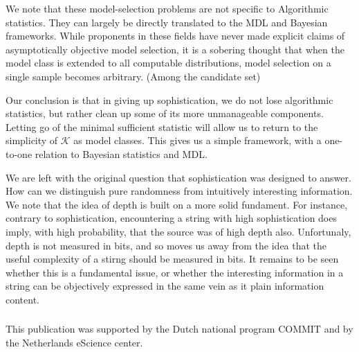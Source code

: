 \documentclass{style/llncs}
\newcommand{\K}{\mathscr K}
\begin{document}
We note that these model-selection problems are not specific to Algorithmic statistics. They can largely be directly translated to the MDL and Bayesian frameworks. While proponents in these fields have never made explicit claims of asymptotically objective model selection, it is a sobering thought that when the model class is extended to all computable distributions, model selection on a single sample becomes arbitrary. (Among the candidate set)

Our conclusion is that in giving up sophistication, we do not lose algorithmic statistics, but rather clean up some of its more unmanageable components. Letting go of the minimal sufficient statistic will allow us to return to the simplicity of $\K$ as model classes. This gives us a simple framework, with a one-to-one relation to Bayesian statistics and MDL. 

We are left with the original question that sophistication was designed to answer. How can we distinguish pure randomness from intuitively interesting information. We note that the idea of depth is built on a more solid fundament. For instance, contrary to sophistication, encountering a string with high sophistication does imply, with high probability, that the source was of high depth also. Unfortunaly, depth is not measured in bits, and so moves us away from the idea that the useful complexity of a stirng should be measured in bits. It remains to be seen whether this is a fundamental issue, or whether the interesting information in a string can be objectively expressed in the same vein as it plain information content. 

\subsubsection*{\ackname}

This publication was supported by the Dutch national program COMMIT and by  the Netherlands eScience center.




\appendix
\end{document}
